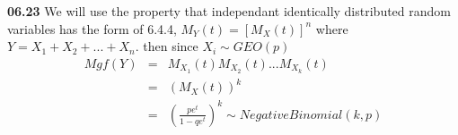 {\bf 06.23} \quad We will use the property that independant identically distributed random variables has the form
of 6.4.4, $M_{Y}(t) = [M_{X}(t)]^n$ where $Y = X_1 + X_2 + ... + X_n$. then since $X_i \sim GEO(p)$ \\

\begin{eqnarray*}
	Mgf(Y) &=& M_{X_1}(t) M_{X_2}(t) ... M_{X_k}(t) \\
		&=& (M_{X}(t))^k \\
		&=& ( \frac{pe^t}{1-qe^t} )^k \sim NegativeBinomial(k,p) \\
\end{eqnarray*}
